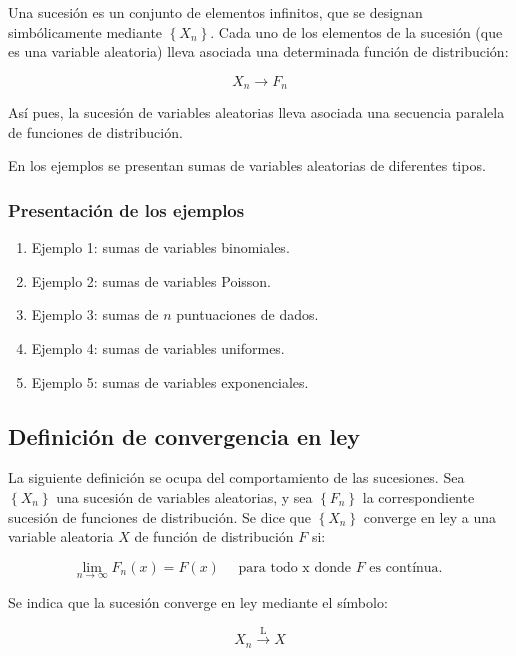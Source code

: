 \documentclass[
  a4paper,
  DIV=11,
  numbers=noendperiod]{scrreprt}
\providecommand{\tightlist}{%
  \setlength{\itemsep}{0pt}\setlength{\parskip}{0pt}}\usepackage{longtable,booktabs,array}
\begin{document}
Una sucesión es un conjunto de elementos infinitos, que se designan
simbólicamente mediante \(\left\{X_{n}\right\}\). Cada uno de los
elementos de la sucesión (que es una variable aleatoria) lleva asociada
una determinada función de distribución:

\[
X_{n} \rightarrow F_{n}
\]

Así pues, la sucesión de variables aleatorias lleva asociada una
secuencia paralela de funciones de distribución.

En los ejemplos se presentan sumas de variables aleatorias de diferentes
tipos.

\subsubsection{Presentación de los
ejemplos}\label{presentaciuxf3n-de-los-ejemplos}

\begin{enumerate}
\def\labelenumi{\arabic{enumi}.}
\tightlist
\item
  Ejemplo 1: sumas de variables binomiales.
\item
  Ejemplo 2: sumas de variables Poisson.
\item
  Ejemplo 3: sumas de \(n\) puntuaciones de dados.
\item
  Ejemplo 4: sumas de variables uniformes.
\item
  Ejemplo 5: sumas de variables exponenciales.
\end{enumerate}

\subsection{Definición de convergencia en
ley}\label{definiciuxf3n-de-convergencia-en-ley}

La siguiente definición se ocupa del comportamiento de las sucesiones.
Sea \(\left\{X_{n}\right\}\) una sucesión de variables aleatorias, y sea
\(\left\{F_{n}\right\}\) la correspondiente sucesión de funciones de
distribución. Se dice que \(\left\{X_{n}\right\}\) converge en ley a una
variable aleatoria \(X\) de función de distribución \(F\) si:

\[
\lim _{n \rightarrow \infty} F_{n}(x)=F(x) \quad \text { para todo } \mathrm{x} \text { donde } F \text { es contínua. }
\]

Se indica que la sucesión converge en ley mediante el símbolo:

\[
X_{n} \stackrel{\mathrm{L}}{\rightarrow} X
\]
\end{document}
